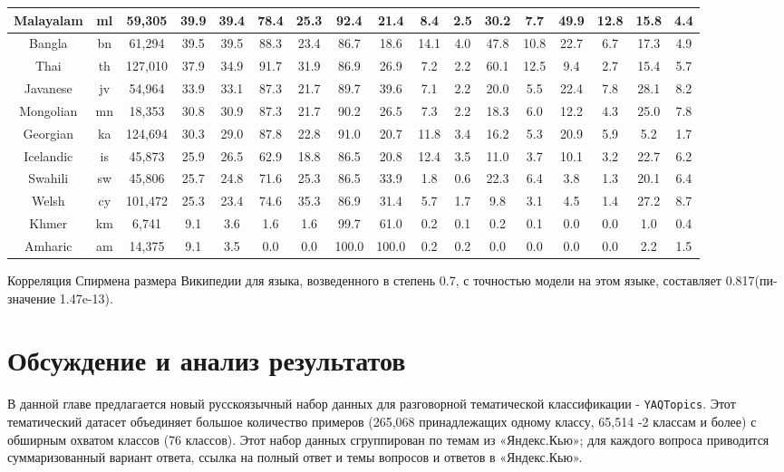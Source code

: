 \begin{table*}
{\begin{tabular}{|c|c|c||c|c|c|c|c|c|c|c|c|c|c|c|c|c|}
Malayalam & ml & 59,305 & 39.9 & 39.4 & 78.4 & 25.3 & 92.4 & 21.4 & 8.4 & 2.5 & 30.2 & 7.7 & 49.9 & 12.8 & 15.8 & 4.4\\ \hline
Bangla & bn & 61,294 & 39.5 & 39.5 & 88.3 & 23.4 & 86.7 & 18.6 & 14.1 & 4.0 & 47.8 & 10.8 & 22.7 & 6.7 & 17.3 & 4.9\\ \hline
Thai & th & 127,010 & 37.9 & 34.9 & 91.7 & 31.9 & 86.9 & 26.9 & 7.2 & 2.2 & 60.1 & 12.5 & 9.4 & 2.7 & 15.4 & 5.7\\ \hline
Javanese & jv & 54,964 & 33.9 & 33.1 & 87.3 & 21.7 & 89.7 & 39.6 & 7.1 & 2.2 & 20.0 & 5.5 & 22.4 & 7.8 & 28.1 & 8.2\\ \hline
Mongolian & mn & 18,353 & 30.8 & 30.9 & 87.3 & 21.7 & 90.2 & 26.5 & 7.3 & 2.2 & 18.3 & 6.0 & 12.2 & 4.3 & 25.0 & 7.8\\ \hline
Georgian & ka & 124,694 & 30.3 & 29.0 & 87.8 & 22.8 & 91.0 & 20.7 & 11.8 & 3.4 & 16.2 & 5.3 & 20.9 & 5.9 & 5.2 & 1.7\\ \hline
Icelandic & is & 45,873 & 25.9 & 26.5 & 62.9 & 18.8 & 86.5 & 20.8 & 12.4 & 3.5 & 11.0 & 3.7 & 10.1 & 3.2 & 22.7 & 6.2\\ \hline
Swahili & sw & 45,806 & 25.7 & 24.8 & 71.6 & 25.3 & 86.5 & 33.9 & 1.8 & 0.6 & 22.3 & 6.4 & 3.8 & 1.3 & 20.1 & 6.4\\ \hline
Welsh & cy & 101,472 & 25.3 & 23.4 & 74.6 & 35.3 & 86.9 & 31.4 & 5.7 & 1.7 & 9.8 & 3.1 & 4.5 & 1.4 & 27.2 & 8.7\\ \hline
Khmer & km & 6,741 & 9.1 & 3.6 & 1.6 & 1.6 & 99.7 & 61.0 & 0.2 & 0.1 & 0.2 & 0.1 & 0.0 & 0.0 & 1.0 & 0.4\\ \hline
Amharic & am & 14,375 & 9.1 & 3.5 & 0.0 & 0.0 & 100.0 & 100.0 & 0.2 & 0.2 & 0.0 & 0.0 & 0.0 & 0.0 & 2.2 & 1.5\\ \hline
\end{tabular}
}
\end{table*}
Корреляция Спирмена размера Википедии для языка, возведенного в степень 0.7, с точностью модели на этом языке, составляет 0.817(пи-значение 1.47e-13).


\section{Обсуждение и анализ результатов} 

В данной главе предлагается новый русскоязычный набор данных для разговорной тематической классификации - \texttt{YAQTopics}. Этот тематический датасет объединяет большое количество примеров (265,068 принадлежащих одному классу, 65,514 -2 классам и более) с обширным охватом классов (76 классов). Этот набор данных сгруппирован по темам из «Яндекс.Кью»; для каждого вопроса приводится суммаризованный вариант ответа, ссылка на полный ответ и темы вопросов и ответов в «Яндекс.Кью».

